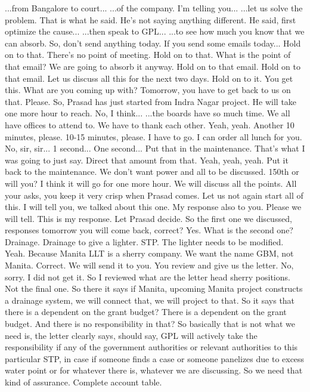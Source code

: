 ...from Bangalore to court...
...of the company.
I'm telling you...
...let us solve the problem.
That is what he said.
He's not saying anything different.
He said, first optimize the cause...
...then speak to GPL...
...to see how much you know that we can absorb.
So, don't send anything today.
If you send some emails today...
Hold on to that.
There's no point of meeting.
Hold on to that.
What is the point of that email?
We are going to absorb it anyway.
Hold on to that email.
Hold on to that email.
Let us discuss all this for the next two days.
Hold on to it.
You get this.
What are you coming up with?
Tomorrow, you have to get back to us on that.
Please.
So, Prasad has just started from Indra Nagar project.
He will take one more hour to reach.
No, I think...
...the boards have so much time.
We all have offices to attend to.
We have to thank each other.
Yeah, yeah.
Another 10 minutes, please.
10-15 minutes, please.
I have to go.
I can order all lunch for you.
No, sir, sir...
1 second...
One second...
Put that in the maintenance.
That's what I was going to just say.
Direct that amount from that.
Yeah, yeah, yeah.
Put it back to the maintenance. We don't want power and all to be discussed.
150th or will you?
I think it will go for one more hour. We will discuss all the points.
All your asks, you keep it very crisp when Prasad comes. Let us not again start all of this.
I will tell you, we talked about this one.
My response also to you. Please we will tell. This is my response. Let Prasad decide.
So the first one we discussed, responses tomorrow you will come back, correct?
Yes.
What is the second one?
Drainage.
Drainage to give a lighter.
STP.
The lighter needs to be modified.
Yeah.
Because Manita LLT is a sherry company. We want the name GBM, not Manita.
Correct.
We will send it to you. You review and give us the letter.
No, sorry. I did not get it.
So I reviewed what are the letter head sherry positions.
Not the final one.
So there it says if Manita, upcoming Manita project constructs a drainage system, we will
connect that, we will project to that.
So it says that there is a dependent on the grant budget?
There is a dependent on the grant budget.
And there is no responsibility in that?
So basically that is not what we need is, the letter clearly says, should say, GPL will
actively take the responsibility if any of the government authorities or relevant authorities
to this particular STP, in case if someone finds a case or someone panelizes due to excess
water point or for whatever there is, whatever we are discussing.
So we need that kind of assurance.
Complete account table.
